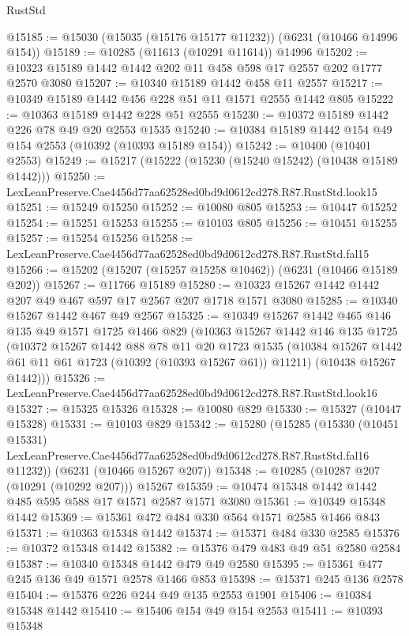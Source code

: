 \begin{lexlean}{RustStd}
\begin{coremodule}
{{@15185 := @15030 (@15035 (@15176 @15177 @11232)) (@6231 (@10466 @14996 @154))
@15189 := @10285 (@11613 (@10291 @11614)) @14996
@15202 := @10323 @15189 @1442 @1442 @202 @11 @458 @598 @17 @2557 @202 @1777 @2570 @3080
@15207 := @10340 @15189 @1442 @458 @11 @2557
@15217 := @10349 @15189 @1442 @456 @228 @51 @11 @1571 @2555 @1442 @805
@15222 := @10363 @15189 @1442 @228 @51 @2555
@15230 := @10372 @15189 @1442 @226 @78 @49 @20 @2553 @1535
@15240 := @10384 @15189 @1442 @154 @49 @154 @2553 (@10392 (@10393 @15189 @154))
@15242 := @10400 (@10401 @2553)
@15249 := @15217 (@15222 (@15230 (@15240 @15242) (@10438 @15189 @1442)))
@15250 := LexLeanPreserve.Cae4456d77aa62528ed0bd9d0612cd278.R87.RustStd.look15
@15251 := @15249 @15250
@15252 := @10080 @805
@15253 := @10447 @15252
@15254 := @15251 @15253
@15255 := @10103 @805
@15256 := @10451 @15255
@15257 := @15254 @15256
@15258 := LexLeanPreserve.Cae4456d77aa62528ed0bd9d0612cd278.R87.RustStd.fal15
@15266 := @15202 (@15207 (@15257 @15258 @10462)) (@6231 (@10466 @15189 @202))
@15267 := @11766 @15189
@15280 := @10323 @15267 @1442 @1442 @207 @49 @467 @597 @17 @2567 @207 @1718 @1571 @3080
@15285 := @10340 @15267 @1442 @467 @49 @2567
@15325 := @10349
    @15267
    @1442
    @465
    @146
    @135
    @49
    @1571
    @1725
    @1466
    @829
    (@10363
      @15267
      @1442
      @146
      @135
      @1725
      (@10372
        @15267
        @1442
        @88
        @78
        @11
        @20
        @1723
        @1535
        (@10384 @15267 @1442 @61 @11 @61 @1723 (@10392 (@10393 @15267 @61)) @11211)
        (@10438 @15267 @1442)))
@15326 := LexLeanPreserve.Cae4456d77aa62528ed0bd9d0612cd278.R87.RustStd.look16
@15327 := @15325 @15326
@15328 := @10080 @829
@15330 := @15327 (@10447 @15328)
@15331 := @10103 @829
@15342 := @15280
    (@15285
      (@15330
        (@10451 @15331)
        LexLeanPreserve.Cae4456d77aa62528ed0bd9d0612cd278.R87.RustStd.fal16
        @11232))
    (@6231 (@10466 @15267 @207))
@15348 := @10285 (@10287 @207 (@10291 (@10292 @207))) @15267
@15359 := @10474 @15348 @1442 @1442 @485 @595 @588 @17 @1571 @2587 @1571 @3080
@15361 := @10349 @15348 @1442
@15369 := @15361 @472 @484 @330 @564 @1571 @2585 @1466 @843
@15371 := @10363 @15348 @1442
@15374 := @15371 @484 @330 @2585
@15376 := @10372 @15348 @1442
@15382 := @15376 @479 @483 @49 @51 @2580 @2584
@15387 := @10340 @15348 @1442 @479 @49 @2580
@15395 := @15361 @477 @245 @136 @49 @1571 @2578 @1466 @853
@15398 := @15371 @245 @136 @2578
@15404 := @15376 @226 @244 @49 @135 @2553 @1901
@15406 := @10384 @15348 @1442
@15410 := @15406 @154 @49 @154 @2553
@15411 := @10393 @15348
}}
\end{coremodule}
\end{lexlean}

